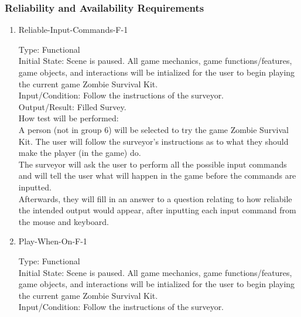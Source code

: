 \documentclass[12pt, titlepage]{article}
\newcounter{ftnum}
\newcounter{nftnum}
\begin{document}
\subsubsection{Reliability and Availability Requirements}

\begin{enumerate}
	
	\item{Reliable-Input-Commands-F-1\\}  \label{NF14}
	
	Type: Functional \\
	
	Initial State: Scene is paused. All game mechanics, game functions/features, game objects, and interactions will be intialized for the user to begin playing the current game Zombie Survival Kit.\\
	
	Input/Condition: Follow the instructions of the surveyor.\\
	
	Output/Result: Filled Survey.\\
	
	How test will be performed:\\ A person (not in group 6) will be selected to try the game Zombie Survival Kit. The user will follow the surveyor's instructions as to what they should make the player (in the game) do. \\
	The surveyor will ask the user to perform all the possible input commands and will tell the user what will happen in the game before the commands are inputted. \\
	Afterwards, they will fill in an answer to a question relating to how reliabile the intended output would appear, after inputting each input command from the mouse and keyboard.\\
	
	\item{Play-When-On-F-1\\}  \label{NF15}
	 
	Type: Functional\\
	
	Initial State: Scene is paused. All game mechanics, game functions/features, game objects, and interactions will be intialized for the user to begin playing the current game Zombie Survival Kit.\\
	
	Input/Condition: Follow the instructions of the surveyor.\\
	

\end{enumerate}
\end{document}
